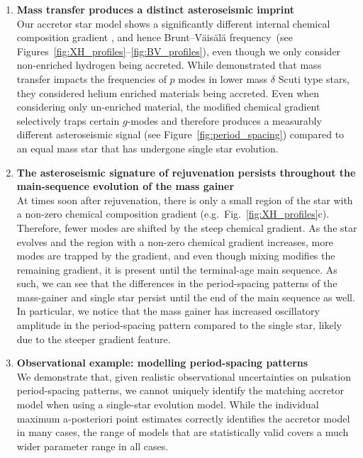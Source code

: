 \documentclass[twocolumn, twocolappendix, oneside]{aastex631}
\newcommand{\bvf}{Brunt–Väisälä frequency\xspace}
\newcommand{\gmodes}{$g$-modes\xspace}
\begin{document}
\begin{enumerate}
    \item \textbf{Mass transfer produces a distinct asteroseismic imprint}\\Our accretor star model shows a significantly different internal chemical composition gradient \citep[e.g.][]{Renzo+2021}, and hence \bvf\ (see Figures~\ref{fig:XH_profiles}--\ref{fig:BV_profiles}), even though we only consider non-enriched hydrogen being accreted. While \citet{Miszuda+2021} demonstrated that mass transfer impacts the frequencies of $p$ modes in lower mass $\delta$ Scuti type stars, they considered helium enriched materials being accreted. Even when considering only un-enriched material, the modified chemical gradient selectively traps certain \gmodes and therefore produces a measurably different asteroseismic signal (see Figure~\ref{fig:period_spacing}) compared to an equal mass star that has undergone single star evolution.
    \item {\bf The asteroseismic signature of rejuvenation persists throughout the main-sequence evolution of the mass gainer}\\ At times soon after rejuvenation, there is only a small region of the star with a non-zero chemical composition gradient (e.g.\ Fig.~\ref{fig:XH_profiles}c). Therefore, fewer modes are shifted by the steep chemical gradient. As the star evolves and the region with a non-zero chemical gradient increases, more modes are trapped by the gradient, and even though mixing modifies the remaining gradient, it is present until the terminal-age main sequence. As such, we can see that the differences in the period-spacing patterns of the mass-gainer and single star persist until the end of the main sequence as well. In particular, we notice that the mass gainer has increased oscillatory amplitude in the period-spacing pattern compared to the single star, likely due to the steeper gradient feature.
    \item {\bf Observational example: modelling period-spacing patterns}\\We demonstrate that, given realistic observational uncertainties on pulsation period-spacing patterns, we cannot uniquely identify the matching accretor model when using a single-star evolution model. While the individual maximum a-posteriori point estimates correctly identifies the accretor model in many cases, the range of models that are statistically valid covers a much wider parameter range in all cases. 


\end{enumerate}
\end{document}
